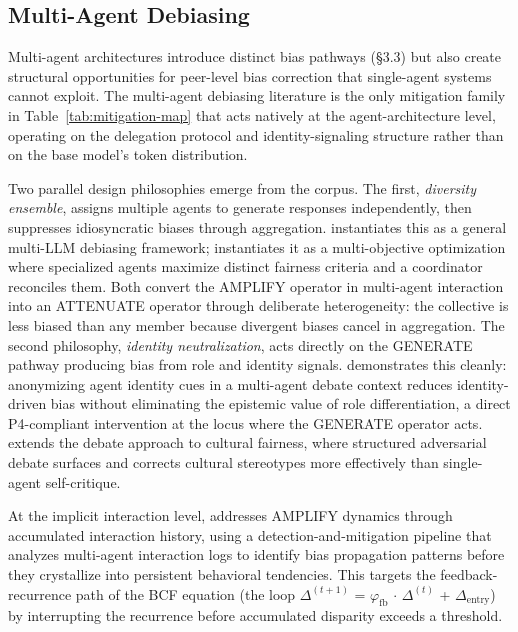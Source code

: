 \documentclass[acmsmall,nonacm]{acmart}
\begin{document}
\subsection{Multi-Agent Debiasing}

Multi-agent architectures introduce distinct bias pathways (\S{}3.3) but also create structural opportunities for peer-level bias correction that single-agent systems cannot exploit. The multi-agent debiasing literature is the only mitigation family in Table~\ref{tab:mitigation-map} that acts natively at the agent-architecture level, operating on the delegation protocol and identity-signaling structure rather than on the base model's token distribution.

Two parallel design philosophies emerge from the corpus. The first, \emph{diversity ensemble}, assigns multiple agents to generate responses independently, then suppresses idiosyncratic biases through aggregation. \cite{owens2024multi} instantiates this as a general multi-LLM debiasing framework; \cite{xu2024mitigating} instantiates it as a multi-objective optimization where specialized agents maximize distinct fairness criteria and a coordinator reconciles them. Both convert the AMPLIFY operator in multi-agent interaction into an ATTENUATE operator through deliberate heterogeneity: the collective is less biased than any member because divergent biases cancel in aggregation. The second philosophy, \emph{identity neutralization}, acts directly on the GENERATE pathway producing bias from role and identity signals. \cite{choi2025identity} demonstrates this cleanly: anonymizing agent identity cues in a multi-agent debate context reduces identity-driven bias without eliminating the epistemic value of role differentiation, a direct P4-compliant intervention at the locus where the GENERATE operator acts. \cite{ki2025multiple} extends the debate approach to cultural fairness, where structured adversarial debate surfaces and corrects cultural stereotypes more effectively than single-agent self-critique.

At the implicit interaction level, \cite{borah2024implicit} addresses AMPLIFY dynamics through accumulated interaction history, using a detection-and-mitigation pipeline that analyzes multi-agent interaction logs to identify bias propagation patterns before they crystallize into persistent behavioral tendencies. This targets the feedback-recurrence path of the BCF equation (the loop $\Delta^{(t+1)}$ = $\varphi_{\mathrm{fb}}$ $\cdot$ $\Delta^{(t)}$ + $\Delta_{\mathrm{entry}}$) by interrupting the recurrence before accumulated disparity exceeds a threshold.
\end{document}
